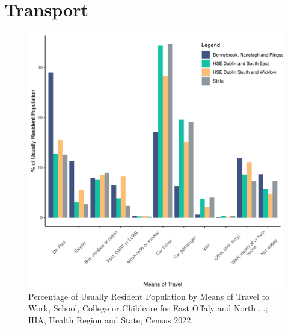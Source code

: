 \documentclass{article}
\begin{document}
\section{Transport}\label{sect:Trans}
\begin{figure}[H]
	\centering
	\includegraphics[width = 120mm]{../figures/TravelED.pdf}
	\caption{Percentage of Usually Resident Population by Means of Travel to Work, School, College or Childcare for East Offaly and North ...; IHA, Health Region and State; Census 2022.}
	\label{fig:vbnv}
	\end{figure}
\end{document}
